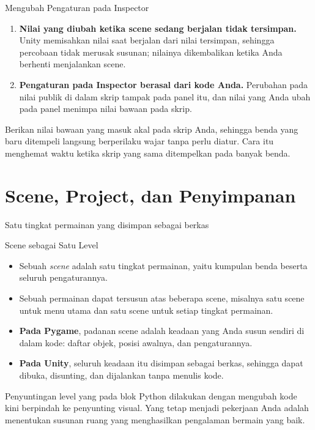 \documentclass[aspectratio=169,10pt]{beamer}
\begin{document}
\begin{frame}{Mengubah Pengaturan pada Inspector}
\begin{enumerate}
  \item \textbf{Nilai yang diubah ketika scene sedang berjalan tidak
        tersimpan.} Unity memisahkan nilai saat berjalan dari nilai tersimpan,
        sehingga percobaan tidak merusak susunan; nilainya dikembalikan ketika
        Anda berhenti menjalankan scene.
  \item \textbf{Pengaturan pada Inspector berasal dari kode Anda.} Perubahan
        pada nilai publik di dalam skrip tampak pada panel itu, dan nilai yang
        Anda ubah pada panel menimpa nilai bawaan pada skrip.
\end{enumerate}
\vspace{0.14cm}
\begin{kiat}
Berikan nilai bawaan yang masuk akal pada skrip Anda, sehingga benda yang baru
ditempeli langsung berperilaku wajar tanpa perlu diatur. Cara itu menghemat
waktu ketika skrip yang sama ditempelkan pada banyak benda.
\end{kiat}
\end{frame}

\section{Scene, Project, dan Penyimpanan}
  {Satu tingkat permainan yang disimpan sebagai berkas}

\begin{frame}{Scene sebagai Satu Level}
\begin{itemize}
  \item Sebuah \emph{scene} adalah satu tingkat permainan, yaitu kumpulan
        benda beserta seluruh pengaturannya.
  \item Sebuah permainan dapat tersusun atas beberapa scene, misalnya satu
        scene untuk menu utama dan satu scene untuk setiap tingkat permainan.
  \item \textbf{Pada Pygame}, padanan scene adalah keadaan yang Anda susun
        sendiri di dalam kode: daftar objek, posisi awalnya, dan pengaturannya.
  \item \textbf{Pada Unity}, seluruh keadaan itu disimpan sebagai berkas,
        sehingga dapat dibuka, disunting, dan dijalankan tanpa menulis kode.
\end{itemize}
\vspace{0.14cm}
\begin{kotak}
Penyuntingan level yang pada blok Python dilakukan dengan mengubah kode kini
berpindah ke penyunting visual. Yang tetap menjadi pekerjaan Anda adalah
menentukan susunan ruang yang menghasilkan pengalaman bermain yang baik.
\end{kotak}
\end{frame}
\end{document}
